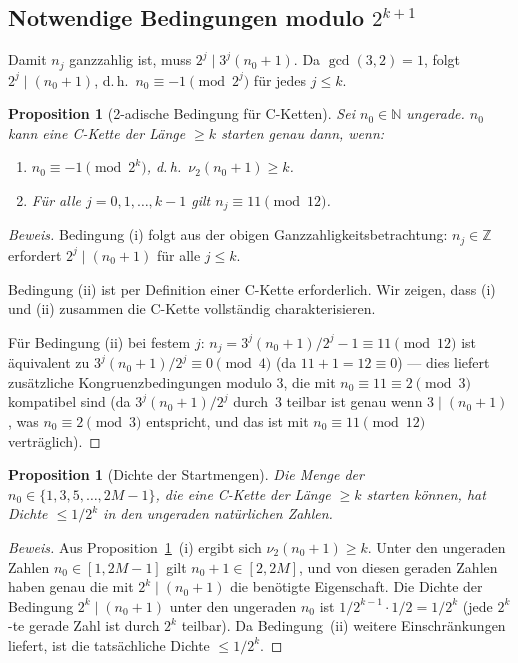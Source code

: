 \documentclass[12pt,a4paper]{article}
\newtheorem{proposition}[definition]{Proposition}
\newenvironment{beweis}{\begin{proof}[Beweis]}{\end{proof}}
\newcommand{\vii}{\nu_2}
\newcommand{\N}{\mathbb{N}}
\newcommand{\Z}{\mathbb{Z}}
\begin{document}
\subsection{Notwendige Bedingungen modulo $2^{k+1}$}

Damit $n_j$ ganzzahlig ist, muss $2^j \mid 3^j(n_0+1)$. Da $\gcd(3,2)=1$,
folgt $2^j \mid (n_0+1)$, d.\,h.\ $n_0 \equiv -1 \pmod{2^j}$ für jedes
$j \leq k$.

\begin{proposition}[2-adische Bedingung für C-Ketten]
\label{prop:2adisch-bed}
Sei $n_0 \in \N$ ungerade. $n_0$ kann eine C-Kette der Länge $\geq k$ starten
genau dann, wenn:
\begin{enumerate}[label=(\roman*)]
  \item $n_0 \equiv -1 \pmod{2^k}$, d.\,h.\ $\vii(n_0+1) \geq k$.
  \item Für alle $j = 0, 1, \ldots, k-1$ gilt $n_j \equiv 11 \pmod{12}$.
\end{enumerate}
\end{proposition}

\begin{beweis}
Bedingung (i) folgt aus der obigen Ganzzahligkeitsbetrachtung: $n_j \in \Z$
erfordert $2^j \mid (n_0+1)$ für alle $j \leq k$.

Bedingung (ii) ist per Definition einer C-Kette erforderlich. Wir zeigen,
dass (i) und (ii) zusammen die C-Kette vollständig charakterisieren.

Für Bedingung (ii) bei festem $j$: $n_j = 3^j(n_0+1)/2^j - 1 \equiv 11 \pmod{12}$
ist äquivalent zu $3^j(n_0+1)/2^j \equiv 0 \pmod{4}$ (da $11+1=12 \equiv 0$)
--- dies liefert zusätzliche Kongruenzbedingungen modulo $3$, die mit
$n_0 \equiv 11 \equiv 2 \pmod 3$ kompatibel sind (da $3^j(n_0+1)/2^j$ durch~3
teilbar ist genau wenn $3 \mid (n_0+1)$, was $n_0 \equiv 2 \pmod 3$
entspricht, und das ist mit $n_0 \equiv 11 \pmod{12}$ verträglich).
\end{beweis}

\begin{proposition}[Dichte der Startmengen]
\label{prop:dichte}
Die Menge der $n_0 \in \{1,3,5,\ldots,2M-1\}$, die eine C-Kette der Länge
$\geq k$ starten können, hat Dichte $\leq 1/2^k$ in den ungeraden natürlichen
Zahlen.
\end{proposition}

\begin{beweis}
Aus Proposition~\ref{prop:2adisch-bed}~(i) ergibt sich $\vii(n_0+1) \geq k$.
Unter den ungeraden Zahlen $n_0 \in [1, 2M-1]$ gilt $n_0 + 1 \in [2, 2M]$,
und von diesen geraden Zahlen haben genau die mit $2^k \mid (n_0+1)$ die
benötigte Eigenschaft. Die Dichte der Bedingung $2^k \mid (n_0+1)$ unter den
ungeraden $n_0$ ist $1/2^{k-1} \cdot 1/2 = 1/2^k$
(jede $2^k$-te gerade Zahl ist durch $2^k$ teilbar). Da Bedingung~(ii)
weitere Einschränkungen liefert, ist die tatsächliche Dichte $\leq 1/2^k$.
\end{beweis}
\end{document}
